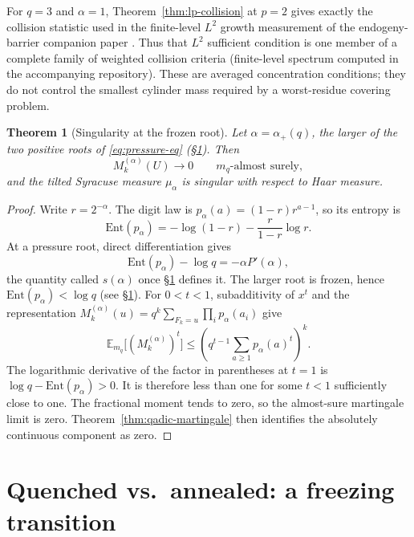 \documentclass[11pt]{article}
\newtheorem{theorem}{Theorem}[section]
\theoremstyle{remark}
\begin{document}
For $q=3$ and $\alpha=1$, Theorem~\ref{thm:lp-collision} at $p=2$
gives exactly the collision statistic used in the finite-level $L^2$
growth measurement of the endogeny-barrier companion paper
\cite{BarrierCompanion}. Thus that $L^2$ sufficient condition is one
member of a complete family of weighted collision criteria
(finite-level spectrum computed in the accompanying repository). These
are averaged concentration conditions; they do not control the
smallest cylinder mass required by a worst-residue covering problem.

\begin{theorem}[Singularity at the frozen root]
\label{thm:frozen-singular}
Let $\alpha=\alpha_+(q)$, the larger of the two positive roots of
\eqref{eq:pressure-eq} (\S\ref{sec:freezing}). Then
\[
 M_k^{(\alpha)}(U)\longrightarrow0
 \qquad m_q\text{-almost surely},
\]
and the tilted Syracuse measure $\mu_\alpha$ is singular with respect
to Haar measure.
\end{theorem}

\begin{proof}
Write $r=2^{-\alpha}$. The digit law is
$p_\alpha(a)=(1-r)r^{a-1}$, so its entropy is
\[
 \mathrm{Ent}(p_\alpha)=-\log(1-r)-\frac{r}{1-r}\log r.
\]
At a pressure root, direct differentiation gives
\[
 \mathrm{Ent}(p_\alpha)-\log q
 =-\alpha P'(\alpha),
\]
the quantity called $s(\alpha)$ once \S\ref{sec:freezing} defines it.
The larger root is frozen, hence $\mathrm{Ent}(p_\alpha)<\log q$ (see
\S\ref{sec:freezing}). For $0<t<1$,
subadditivity of $x^t$ and the representation
$M_k^{(\alpha)}(u)=q^k\sum_{F_k=u}\prod_i p_\alpha(a_i)$ give
\[
 \mathbb E_{m_q}\bigl[(M_k^{(\alpha)})^t\bigr]
 \le\left(q^{t-1}\sum_{a\ge1}p_\alpha(a)^t\right)^k.
\]
The logarithmic derivative of the factor in parentheses at $t=1$ is
$\log q-\mathrm{Ent}(p_\alpha)>0$. It is therefore less than one for some
$t<1$ sufficiently close to one. The fractional moment tends to zero,
so the almost-sure martingale limit is zero. Theorem~\ref{thm:qadic-martingale}
then identifies the absolutely continuous component as zero.
\end{proof}

\section{Quenched vs.\ annealed: a freezing transition}
\label{sec:freezing}
\end{document}
